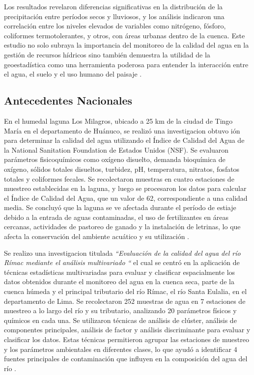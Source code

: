 Los resultados revelaron diferencias significativas en la distribución de la precipitación entre períodos secos y lluviosos, y los análisis indicaron una correlación entre los niveles elevados de variables como nitrógeno, fósforo, coliformes termotolerantes, y otros, con áreas urbanas dentro de la cuenca. Este estudio no solo subraya la importancia del monitoreo de la calidad del agua en la gestión de recursos hídricos sino también demuestra la utilidad de la geoestadística como una herramienta poderosa para entender la interacción entre el agua, el suelo y el uso humano del paisaje \cite{sousa}.

\subsection{Antecedentes Nacionales}
En el humedal laguna Los Milagros, ubicado a 25 km de la ciudad de Tingo María en el departamento de Huánuco, se realizó una investigacion obtuvo ión para determinar la calidad del agua utilizando el Índice de Calidad del Agua de la National Sanitation Foundation de Estados Unidos (NSF). Se evaluaron parámetros fisicoquímicos como oxígeno disuelto, demanda bioquímica de oxígeno, sólidos totales disueltos, turbidez, pH, temperatura, nitratos, fosfatos totales y coliformes fecales. Se recolectaron muestras en cuatro estaciones de muestreo establecidas en la laguna, y luego se procesaron los datos para calcular el Índice de Calidad del Agua, que un valor de 62, correspondiente a una calidad media. Se concluyó que la laguna se ve afectada durante el período de estiaje debido a la entrada de aguas contaminadas, el uso de fertilizantes en áreas cercanas, actividades de pastoreo de ganado y la instalación de letrinas, lo que afecta la conservación del ambiente acuático y su utilización \cite{alarcon}.

Se realizo una investigacion titulada \textit{``Evaluación de la calidad del agua del río Rímac mediante el análisis multivariado ``} el cual se centró en la aplicación de técnicas estadísticas multivariadas para evaluar y clasificar espacialmente los datos obtenidos durante el monitoreo del agua en la cuenca seca, parte de la cuenca húmeda y el principal tributario del río Rímac, el río Santa Eulalia, en el departamento de Lima. Se recolectaron 252 muestras de agua en 7 estaciones de muestreo a lo largo del río y su tributario, analizando 20 parámetros físicos y químicos en cada una. Se utilizaron técnicas de análisis de clúster, análisis de componentes principales, análisis de factor y análisis discriminante para evaluar y clasificar los datos. Estas técnicas permitieron agrupar las estaciones de muestreo y los parámetros ambientales en diferentes clases, lo que ayudó a identificar 4 fuentes principales de contaminación que influyen en la composición del agua del río \cite{Espiritu2010}.

